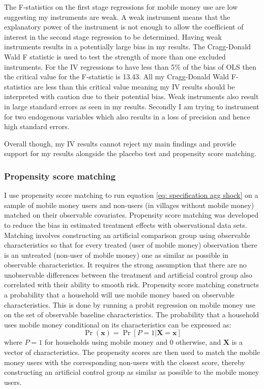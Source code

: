 The F-statistics on the first stage regressions for mobile money use are low suggesting my instruments are weak. A weak instrument means that the explanatory power of the instrument is not enough to allow the coefficient of interest in the second stage regression to be determined. Having weak instruments results in a potentially large bias in my results. The Cragg-Donald Wald F statistic is used to test the strength of more than one excluded instruments. For the IV regressions to have less than 5\% of the bias of OLS then the critical value for the F-statistic is 13.43. All my Cragg-Donald Wald F-statistics are less than this critical value meaning my IV results should be interpreted with caution due to their potential bias. Weak instruments also result in large standard errors as seen in my results. Secondly I am trying to instrument for two endogenous variables which also results in a loss of precision and hence high standard errors. 

Overall though, my IV results cannot reject my main findings and provide support for my results alongside the placebo test and propensity score matching. 

\subsubsection{Propensity score matching}
I use propensity score matching to run equation \eqref{eq: specification agg shock} on a sample of mobile money users and non-users (in villages without mobile money) matched on their observable covariates. Propensity score matching was  developed to reduce the bias in estimated treatment effects with observational data sets. Matching involves constructing an artificial comparison group using observable characteristics so that for every treated (user of mobile money) observation there is an untreated (non-user of mobile money) one as similar as possible in observable characteristics. It requires the strong assumption that there are no unobservable differences between the treatment and artificial control group also correlated with their ability to smooth risk.    
Propensity score matching constructs a probability that a household will use mobile money based on observable characteristics. This is done by running a probit regression on mobile money use on the set of observable baseline characteristics. The probability that a household uses mobile money conditional on its characteristics can be expressed as: 
\begin{equation}
\Pr(\mathbf{x})=\Pr[P=1|\mathbf{X=x}]
\end{equation}
where $P=1$ for households using mobile money and 0 otherwise, and $\mathbf{X}$ is a vector of characteristics. The propensity scores are then used to match the mobile money users with the corresponding non-users with the closest score, thereby constructing an artificial control group as similar as possible to the mobile money users. 


